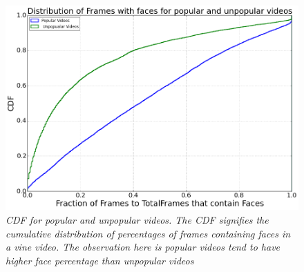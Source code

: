 \begin{figure}[!htb]
\centering
\includegraphics[width=\columnwidth]{plots/FaceCDF}
\caption{\textsl{ CDF for popular and unpopular videos. The CDF signifies the cumulative distribution of percentages of frames containing faces in a vine video. The observation here is popular videos tend to have higher face percentage than unpopular videos}}
\label{fig:Face_CDF}
\end{figure}

